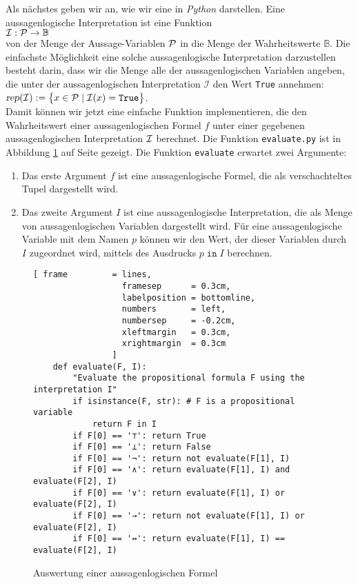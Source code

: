 Als nächstes geben wir an, wie wir eine  in \textsl{Python}
darstellen.  Eine aussagenlogische Interpretation ist eine Funktion \\[0.2cm]
\hspace*{1.3cm} ${\cal I}: {\cal P} \rightarrow \mathbb{B}$ \\[0.2cm]
von der Menge der Aussage-Variablen ${\cal P}$ in die Menge der Wahrheitswerte 
$\mathbb{B}$.  Die einfachste Möglichkeit eine solche aussagenlogische Interpretation darzustellen besteht
darin,  dass wir die Menge alle der aussagenlogischen Variablen angeben, die unter der aussagenlogischen
Interpretation $\mathcal{I}$ den Wert \texttt{True} annehmen:
\\[0.2cm]
\hspace*{1.3cm}
$\textsl{rep}(\mathcal{I}) := \bigl\{ x \in \mathcal{P} \mid \mathcal{I}(x) = \texttt{True} \bigr\}$.
\\[0.2cm]
Damit können wir jetzt eine einfache Funktion implementieren, die den Wahrheitswert
einer aussagenlogischen Formel $f$ unter einer gegebenen aussagenlogischen
Interpretation ${\cal I}$ berechnet. Die Funktion
\texttt{evaluate.py}
ist in Abbildung \ref{fig:evaluate.py} auf Seite \pageref{fig:evaluate.py} gezeigt.
Die Funktion \texttt{evaluate} erwartet zwei Argumente:
\begin{enumerate}
\item Das erste Argument $f$ ist eine aussagenlogische Formel, die als verschachteltes Tupel dargestellt
      wird.
\item Das zweite Argument $I$ ist eine aussagenlogische Interpretation, die als Menge von aussagenlogischen Variablen
      dargestellt wird.  Für eine aussagenlogische Variable mit dem Namen $p$ können wir den Wert,
      der dieser Variablen durch $I$ zugeordnet wird, mittels des Ausdrucks $p \;\mathtt{in}\; I$ berechnen.
\end{enumerate}

\begin{figure}[!ht]
  \centering
\begin{Verbatim}[ frame         = lines, 
                  framesep      = 0.3cm, 
                  labelposition = bottomline,
                  numbers       = left,
                  numbersep     = -0.2cm,
                  xleftmargin   = 0.3cm,
                  xrightmargin  = 0.3cm
                ]
    def evaluate(F, I):
        "Evaluate the propositional formula F using the interpretation I"
        if isinstance(F, str): # F is a propositional variable
            return F in I
        if F[0] == '⊤': return True
        if F[0] == '⊥': return False
        if F[0] == '¬': return not evaluate(F[1], I)
        if F[0] == '∧': return evaluate(F[1], I) and evaluate(F[2], I)
        if F[0] == '∨': return evaluate(F[1], I) or evaluate(F[2], I)
        if F[0] == '→': return not evaluate(F[1], I) or evaluate(F[2], I)
        if F[0] == '↔': return evaluate(F[1], I) == evaluate(F[2], I)
\end{Verbatim}
\vspace*{-0.3cm}
  \caption{Auswertung einer aussagenlogischen Formel}
  \label{fig:evaluate.py}
\end{figure} 

